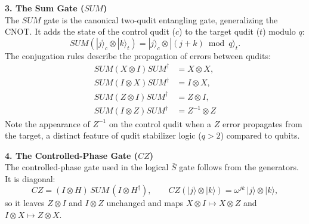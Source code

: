 \textbf{3. The Sum Gate ($SUM$)} \\
The $SUM$ gate is the canonical two-qudit entangling gate, generalizing the CNOT. It adds the state of the control qudit ($c$) to the target qudit ($t$) modulo $q$:
\begin{equation}
    SUM (|j\rangle_c \otimes |k\rangle_t)= |j\rangle_c \otimes |(j+k) \bmod q\rangle_t.
\end{equation}
The conjugation rules describe the propagation of errors between qudits:
\begin{align}
    SUM (X \otimes I) SUM^\dagger &= X \otimes X, \\
    SUM (I \otimes X) SUM^\dagger &= I \otimes X, \\
    SUM (Z \otimes I) SUM^\dagger &= Z \otimes I, \\
    SUM (I \otimes Z) SUM^\dagger &= Z^{-1} \otimes Z
\end{align}
Note the appearance of $Z^{-1}$ on the control qudit when a $Z$ error propagates from the target, a distinct feature of qudit stabilizer logic ($q>2$) compared to qubits.

\textbf{4. The Controlled-Phase Gate ($CZ$)} \\
The controlled-phase gate used in the logical $\bar S$ gate follows from the generators. It is diagonal:
\begin{equation}
    CZ = (I\otimes H)\,SUM\,(I\otimes H^\dagger), \qquad
    CZ (|j\rangle \otimes |k\rangle) = \omega^{jk}\, |j\rangle \otimes |k\rangle,
\end{equation}
so it leaves $Z\otimes I$ and $I\otimes Z$ unchanged and maps $X\otimes I \mapsto X\otimes Z$ and $I\otimes X \mapsto Z\otimes X$.
